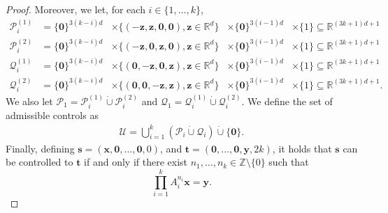\begin{proof}
Moreover, we let, for each $i \in \lbrace 1, \ldots, k \rbrace$,
\begin{align*}
\mathcal{P}_{i}^{(1)} &= {\lbrace \boldsymbol{0} \rbrace}^{3(k-i)d} &\times
\lbrace (-\boldsymbol{z}, \boldsymbol{z}, \boldsymbol{0}, \boldsymbol{0}), \boldsymbol{z} \in \mathbb{R}^{d} \rbrace &\times
{\lbrace \boldsymbol{0} \rbrace}^{3(i-1)d} &\times \lbrace 1 \rbrace
\subseteq \mathbb{R}^{(3k+1)d+1} \\
\mathcal{P}_{i}^{(2)} &= {\lbrace \boldsymbol{0} \rbrace}^{3(k-i)d} &\times
\lbrace (-\boldsymbol{z}, \boldsymbol{0}, \boldsymbol{z}, \boldsymbol{0}), \boldsymbol{z} \in \mathbb{R}^{d} \rbrace &\times
{\lbrace \boldsymbol{0} \rbrace}^{3(i-1)d} &\times \lbrace 1 \rbrace
\subseteq \mathbb{R}^{(3k+1)d+1} \\
\mathcal{Q}_{i}^{(1)} &= {\lbrace \boldsymbol{0} \rbrace}^{3(k-i)d} &\times
\lbrace (\boldsymbol{0}, -\boldsymbol{z}, \boldsymbol{0}, \boldsymbol{z}), \boldsymbol{z} \in \mathbb{R}^{d} \rbrace &\times
{\lbrace \boldsymbol{0} \rbrace}^{3(i-1)d} &\times \lbrace 1 \rbrace
\subseteq \mathbb{R}^{(3k+1)d+1} \\
\mathcal{Q}_{i}^{(2)} &= {\lbrace \boldsymbol{0} \rbrace}^{3(k-i)d} &\times
\lbrace (\boldsymbol{0}, \boldsymbol{0}, -\boldsymbol{z}, \boldsymbol{z}), \boldsymbol{z} \in \mathbb{R}^{d} \rbrace &\times
{\lbrace \boldsymbol{0} \rbrace}^{3(i-1)d} &\times \lbrace 1 \rbrace
\subseteq \mathbb{R}^{(3k+1)d+1}.
\end{align*}
We also let $\mathcal{P}_{1} = \mathcal{P}_{i}^{(1)} \dot{\cup} \mathcal{P}_{i}^{(2)}$ and $\mathcal{Q}_{1} = \mathcal{Q}_{i}^{(1)} \dot{\cup} \mathcal{Q}_{i}^{(2)}$.
We define the set of admissible controls as
\begin{align*}
\mathcal{U} = \bigcup\limits_{i=1}^{k} \left( \mathcal{P}_{i} \dot{\cup} \mathcal{Q}_{i} \right) \dot{\cup} \lbrace \boldsymbol{0} \rbrace.
\end{align*}
Finally, defining $\boldsymbol{s} = (\boldsymbol{x}, \boldsymbol{0}, \ldots, \boldsymbol{0}, 0)$, and $\boldsymbol{t} = (\boldsymbol{0}, \ldots, \boldsymbol{0}, \boldsymbol{y}, 2k)$, it holds that $\boldsymbol{s}$ can be controlled to $\boldsymbol{t}$ if and only if there exist $n_{1}, \ldots, n_{k} \in \mathbb{Z} \setminus \lbrace 0 \rbrace$ such that
\begin{equation*}
\prod\limits_{i=1}^{k}A_{i}^{n_{i}} \boldsymbol{x} = \boldsymbol{y}.
\end{equation*}


\end{proof}
